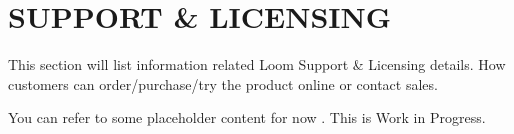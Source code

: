 \documentclass[letterpaper,10pt,english]{sphinxhowto}
\begin{document}
\section{SUPPORT \& LICENSING}
\label{\detokenize{col/ds/mcdmp_ds_opt1:support-licensing}}
This section will list information related Loom Support \& Licensing details. How customers can order/purchase/try the product online or contact sales.

You can refer to some placeholder content for now . This is Work in Progress.


\begin{figure}[htbp]
\centering

\noindent{}
\end{figure}



\renewcommand{\indexname}{Index}
\printindex
\end{document}
